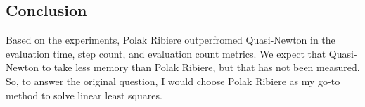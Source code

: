 \documentclass[]{article}
\begin{document}
\subsection{Conclusion}\label{conclusion}

Based on the experiments, Polak Ribiere outperfromed Quasi-Newton in the
evaluation time, step count, and evaluation count metrics. We expect
that Quasi-Newton to take less memory than Polak Ribiere, but that has
not been measured. So, to answer the original question, I would choose
Polak Ribiere as my go-to method to solve linear least squares.
\end{document}
